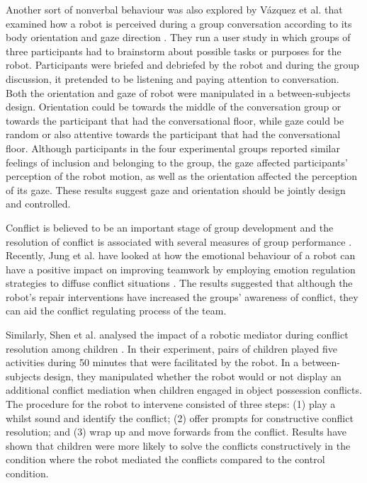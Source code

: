 Another sort of nonverbal behaviour was also explored by Vázquez et al. that examined how a robot is perceived during a group conversation according to its body orientation and gaze direction \cite{vazquez2017towards}. They run a user study in which groups of three participants had to brainstorm about possible tasks or purposes for the robot. Participants were briefed and debriefed by the robot and during the group discussion, it pretended to be listening and paying attention to conversation. Both the orientation and gaze of robot were manipulated in a between-subjects design. Orientation could be towards the middle of the conversation group or towards the participant that had the conversational floor, while gaze could be random or also attentive towards the participant that had the conversational floor. Although participants in the four experimental groups reported similar feelings of inclusion and belonging to the group, the gaze affected participants' perception of the robot motion, as well as the orientation affected the perception of its gaze. These results suggest gaze and orientation should be jointly design and controlled.

Conflict is believed to be an important stage of group development \cite{forsyth1990group} and the resolution of conflict is associated with several measures of group performance \cite{jung2016coupling}. Recently, Jung et al. have looked at how the emotional behaviour of a robot can have a positive impact on improving teamwork by employing emotion regulation strategies to diffuse conflict situations \cite{Jung2015}. The results suggested that although the robot's repair interventions have increased the groups' awareness of conflict, they can aid the conflict regulating process of the team.

Similarly, Shen et al. analysed the impact of a robotic mediator during conflict resolution among children \cite{shen2018stop}. In their experiment, pairs of children played five activities during 50 minutes that were facilitated by the robot. In a between-subjects design, they manipulated whether the robot would or not display an additional conflict mediation when children engaged in object possession conflicts. The procedure for the robot to intervene consisted of three steps: (1) play a whilst sound and identify the conflict; (2) offer prompts for constructive conflict resolution; and (3) wrap up and move forwards from the conflict. Results have shown that children were more likely to solve the conflicts constructively in the condition where the robot mediated the conflicts compared to the control condition.

